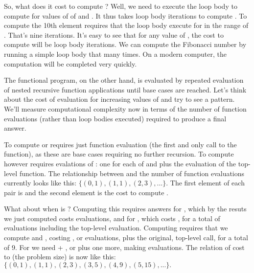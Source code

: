 \documentclass[letterpaper,10pt,english]{sphinxmanual}
\begin{document}
So, what does it cost to compute ? Well, we need to execute
the loop body to compute  for values of  of  and
. It thus takes  loop body iterations to compute . To
compute the 10th element requires that the loop body execute for 
in the range of \sphinxstyleemphasis{{[}2, 3, …, 10{]}}. That’s nine iterations.  It’s easy
to see that for any value of , the cost to compute  will be
 loop body iterations. We can compute the  Fibonacci
number by running a simple loop body  that many times. On a
modern computer, the computation will be completed very quickly.

The functional program, on the other hand, is evaluated by repeated
evaluation of nested recursive function applications until base cases
are reached.  Let’s think about the cost of evaluation for increasing
values of  and try to see a pattern. We’ll measure computational
complexity now in terms of the number of function evaluations (rather
than loop bodies executed) required to produce a final answer.

To compute  or  requires just  function evaluation
(the first and only call to the function), as these are base cases
requiring no further recursion. To compute  however requires
 evalations of : one for each of  and  plus
the evaluation of the top-level function. The relationship between 
and the number of function evaluations currently looks like this:
\(\{ (0,1), (1,1), (2,3), ... \}.\) The first element of each pair
is  and the second element is the cost to compute .

What about when  is ?  Computing this requires answers for
, which by the resuts we just computed costs  evaluations,
and for , which costs , for a total of  evaluations
including the top-level evaluation. Computing  requires that
we compute  and , costing , or  evaluations,
plus the original, top-level call, for a total of 9. For  we
need  + , or  plus one more, making  evaluations.  The
relation of cost to  (the problem size) is now like this: \(\{
(0,1), (1,1), (2,3), (3,5), (4,9), (5, 15), ... \}.\)
\end{document}
